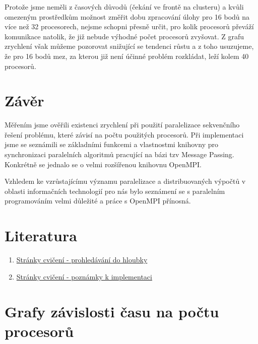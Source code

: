 \documentclass[12pt]{article}
\begin{document}
Protože jsme neměli z časových důvodů (čekání ve frontě na clusteru) a kvůli omezeným prostředkům možnost změřit dobu 
zpracování úlohy pro 16 bodů na více než 32 procesorech, nejsme schopni přesně určit, pro kolik procesorů převáží komunikace
natolik, že již nebude výhodné počet procesorů zvyšovat. Z grafu zrychlení však můžeme pozorovat snižující se tendenci růstu
a z toho usuzujeme, že pro 16 bodů mez, za kterou již není účinné problém rozkládat, leží kolem 40 procesorů.

\section{Závěr}
Měřením jsme ověřili existenci zrychlení při použití paralelizace sekvenčního řešení problému, které
závisí na počtu použitých procesorů.
Při implementaci jsme se seznámili se základními funkcemi a vlastnostmi knihovny pro synchronizaci paralelních algoritmů
pracující na bázi tzv Message Passing. Konkrétně se jednalo se o velmi rozšířenou knihovnu OpenMPI.

Vzhledem ke vzrůstajícímu významu paralelizace a distribuovaných výpočtů v oblasti informačních technologií
pro nás bylo seznámení se s paralelním programováním velmi důležité a práce s OpenMPI přínosná.
\section{Literatura}
\begin{enumerate}
\item \href{https://edux.fit.cvut.cz/courses/MI-PAR/labs/prohledavani_do_hloubky}{Stránky cvičení - prohledávání do hloubky}
\item \href{https://edux.fit.cvut.cz/courses/MI-PAR/labs/poznamky_k_implementaci}{Stránky cvičení - poznámky k implementaci}
\end{enumerate}


\appendix
\section{Grafy závislosti času na počtu procesorů}
\end{document}
